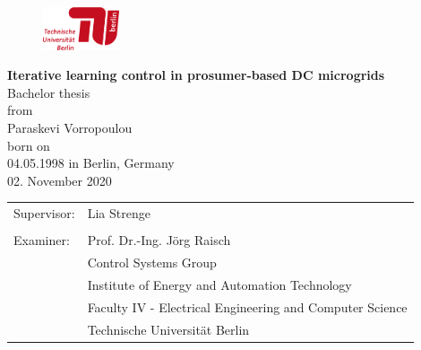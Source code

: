 \begin{titlingpage}
\begin{center}
\begin{figure}[ht]
\begin{center}
		\includegraphics[width=0.2\textwidth]{logos/tu-logo.pdf}
	\label{fig:tulogo}
\end{center}
\end{figure}

\vspace*{3cm}
\sffamily\huge{\textbf{Iterative learning control in prosumer-based DC microgrids}}\\[1\baselineskip]
\normalfont
\vspace*{1cm}
\large
Bachelor thesis\\[0.5\baselineskip]
from\\[0.5\baselineskip]
Paraskevi Vorropoulou\\[0.5\baselineskip]
\normalsize
born on\\[0.5\baselineskip]
04.05.1998 in Berlin, Germany\\[0.5\baselineskip]
\vspace*{1cm}
02. November 2020
\vspace*{1cm}
\begin{table}[hb]
\begin{tabular}{ll}

Supervisor: & Lia Strenge\\
 & \\
Examiner: & Prof. Dr.-Ing. J\"org Raisch\\
& Control Systems Group\\
&  Institute of Energy and Automation Technology\\
& Faculty IV - Electrical Engineering and Computer Science\\
& Technische Universit\"at Berlin
\end{tabular}
\end{table}

\end{center}

\end{titlingpage}
